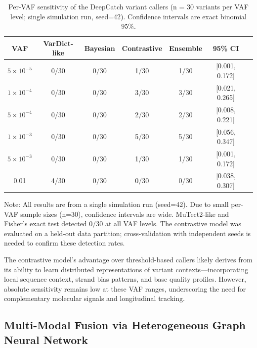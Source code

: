 \documentclass[10pt,a4paper]{article}
\begin{document}
\begin{table}[H]
\centering
\caption{Per-VAF sensitivity of the DeepCatch variant callers (n = 30 variants per VAF level; single simulation run, seed=42). Confidence intervals are exact binomial 95\%.}
\label{tab:vaf_sensitivity}
\begin{tabular}{c c c c c c c}
\toprule
\textbf{VAF} & \textbf{VarDict-like} & \textbf{Bayesian} & \textbf{Contrastive} & \textbf{Ensemble} & \textbf{95\% CI} \\
\midrule
$5\times10^{-5}$ & 0/30 & 0/30 & 1/30 & 1/30 & [0.001, 0.172] \\
$1\times10^{-4}$ & 0/30 & 0/30 & 3/30 & 3/30 & [0.021, 0.265] \\
$5\times10^{-4}$ & 0/30 & 0/30 & 2/30 & 2/30 & [0.008, 0.221] \\
$1\times10^{-3}$ & 0/30 & 0/30 & 5/30 & 5/30 & [0.056, 0.347] \\
$5\times10^{-3}$ & 0/30 & 0/30 & 1/30 & 1/30 & [0.001, 0.172] \\
0.01 & 4/30 & 0/30 & 0/30 & 0/30 & [0.038, 0.307] \\
\bottomrule
\end{tabular}
\vspace{0.3cm}
\footnotesize{Note: All results are from a single simulation run (seed=42). Due to small per-VAF sample sizes (n=30), confidence intervals are wide. MuTect2-like and Fisher's exact test detected 0/30 at all VAF levels. The contrastive model was evaluated on a held-out data partition; cross-validation with independent seeds is needed to confirm these detection rates.}
\end{table}

The contrastive model's advantage over threshold-based callers likely derives from its ability to learn distributed representations of variant contexts—incorporating local sequence context, strand bias patterns, and base quality profiles. However, absolute sensitivity remains low at these VAF ranges, underscoring the need for complementary molecular signals and longitudinal tracking.

\subsection{Multi-Modal Fusion via Heterogeneous Graph Neural Network}
\end{document}
